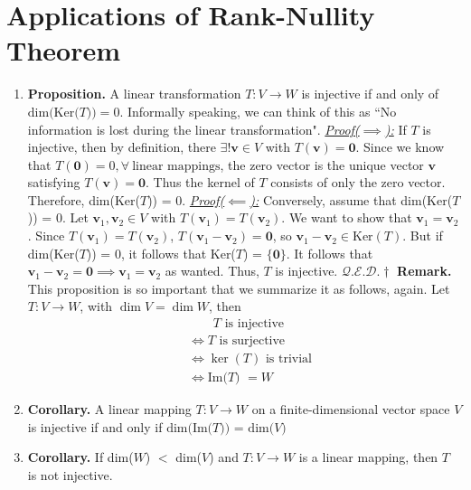 \documentclass[oneside, 12pt]{book}
\newcommand{\settag}[1]{\renewcommand{\theenumi}{#1}}
\newcommand{\qed}{\hfill $\mathcal{Q}.\mathcal{E}.\mathcal{D}.\dagger$}
\newcommand{\tbf}[1]{\textbf{#1}}
\newcommand{\tit}[1]{\textit{#1}}
\newcommand{\proofforward}{\tit{\underline{Proof($\implies$):}}}
\newcommand{\proofback}{\tit{\underline{Proof($\impliedby$):}}}
\newcommand{\trans}[3]{$#1:#2\rightarrow{}#3$}
\newcommand{\para}[1]{\item \tbf{#1}}
\newcommand{\vv}{\mathbf{v}}
\begin{document}
\section{Applications of Rank-Nullity Theorem}
    \begin{enumerate}
        \settag{2.4.2}
        \para{Proposition.} A linear transformation $T:V\rightarrow{} W$ is injective if and only of $\text{dim(Ker}(T\text{))}=0$. Informally speaking, we can think of this as ``No information is lost during the linear transformation". \newline
        \proofforward \newline
            If $T$ is injective, then by definition, there $\exists!\vv \in V$ with $T(\vv) = \mathbf{0}$. Since we know that $T(\mathbf{0}) = 0, \forall~\text{linear mappings}$, the zero vector is the unique vector $\vv$ satisfying $T(\vv) = \mathbf{0}$. Thus the kernel of $T$ consists of only the zero vector. Therefore, dim(Ker($T$)) = 0. \newline
        \proofback \newline
            Conversely, assume that dim(Ker($T$)) = 0. Let $\vv_1, \vv_2 \in V$ with $T(\vv_1) = T(\vv_2)$. We want to show that $\vv_1 = \vv_2$. Since $T(\vv_1) = T(\vv_2)$, $T(\vv_1 - \vv_2) = \mathbf{0}$, so $\vv_1 - \vv_2 \in \text{Ker}(T)$. But if dim(Ker($T$)) = 0, it follows that Ker($T$) = $\{\mathbf{0}\}$. It follows that $\vv_1 - \vv_2 = \mathbf{0} \implies \vv_1 = \vv_2$ as wanted. Thus, $T$ is injective. \qed \newline
        \textbf{Remark.} This proposition is so important that we summarize it as follows, again. Let \trans{T}{V}{W}, with $\dim{V} = \dim{W}$, then
        \begin{align*}
            &~~~~~~~~~ \text{$T$ is injective} \\
            &\iff \text{$T$ is surjective} \\
            &\iff \text{$\ker(T)$ is trivial} \\
            &\iff \text{Im($T$) $= W$}
        \end{align*}
        
        \settag{2.4.3}
        \para{Corollary.} A linear mapping $T:V\rightarrow{} W$ on a finite-dimensional vector space $V$ is injective if and only if $\text{dim(Im(}T\text{)) = dim(}V\text{)}$
        
        \settag{2.4.4}
        \para{Corollary.} If dim($W$) $<$ dim($V$) and \trans{T}{V}{W} is a linear mapping, then $T$ is not injective.
        

\end{enumerate}
\end{document}
